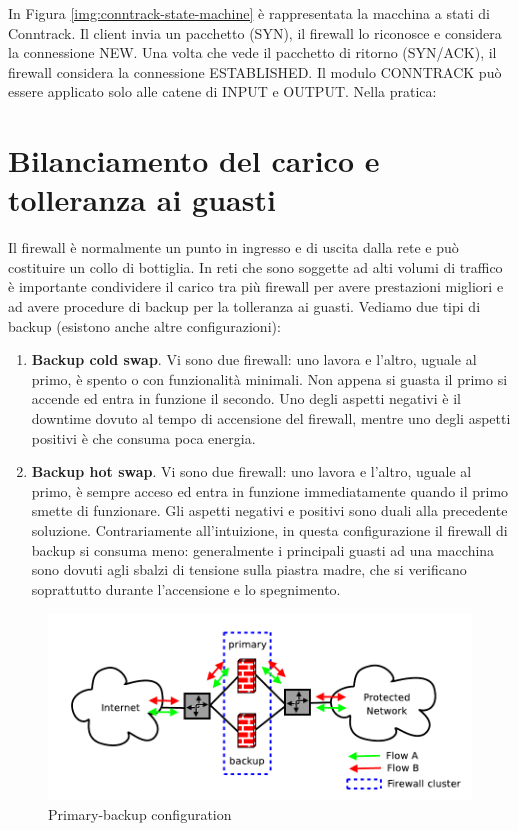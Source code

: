 \begin{enumerate}
In Figura \ref{img:conntrack-state-machine} è rappresentata la macchina a stati di Conntrack. Il client invia un pacchetto (SYN), il firewall lo riconosce e considera la connessione NEW. Una volta che vede il pacchetto di ritorno (SYN/ACK), il firewall considera la connessione ESTABLISHED. Il modulo CONNTRACK può essere applicato solo alle catene di INPUT e OUTPUT. Nella pratica:
\end{enumerate}

\section{Bilanciamento del carico e tolleranza ai guasti}
Il firewall è normalmente un punto in ingresso e di uscita dalla rete e può costituire un collo di bottiglia. In reti che sono soggette ad alti volumi di traffico è importante condividere il carico tra più firewall per avere prestazioni migliori e ad avere procedure di backup per la tolleranza ai guasti. Vediamo due tipi di backup (esistono anche altre configurazioni):
\begin{enumerate}
	\item \textbf{Backup cold swap}. Vi sono due firewall: uno lavora e l'altro, uguale al primo, è spento o con funzionalità minimali. Non appena si guasta il primo si accende ed entra in funzione il secondo. Uno degli aspetti negativi è il downtime dovuto al tempo di accensione del firewall, mentre uno degli aspetti positivi è che consuma poca energia.
	\item \textbf{Backup hot swap}. Vi sono due firewall: uno lavora e l'altro, uguale al primo, è sempre acceso ed entra in funzione immediatamente quando il primo smette di funzionare. Gli aspetti negativi e positivi sono duali alla precedente soluzione. Contrariamente all'intuizione, in questa configurazione il firewall di backup si consuma meno: generalmente i principali guasti ad una macchina sono dovuti agli sbalzi di tensione sulla piastra madre, che si verificano soprattutto durante l'accensione e lo spegnimento.
\end{enumerate}
\begin{figure}[htbp]
	\centering
	\includegraphics[scale = 0.35]{images/primary-configuration-backup}
	\caption{Primary-backup configuration}
	\label{img:primary-configuration-backup}
\end{figure}
